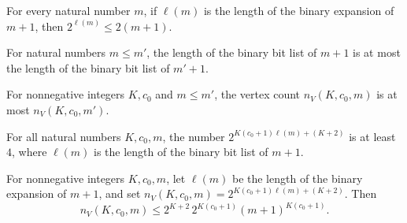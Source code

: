 \begin{lemma}
\label{Complexity.PathHard.two_pow_ell_le}
\leanok
{}
For every natural number $m$, if $\ell(m)$ is the length of the binary expansion of
$m+1$, then $2^{\ell(m)}\leq 2(m+1)$.
\end{lemma}

\begin{lemma}
\label{Complexity.PathHard.ell_mono}
\leanok
{}
For natural numbers $m\le m'$, the length of the binary bit list of $m+1$ is at most the
length of the binary bit list of $m'+1$.
\end{lemma}

\begin{lemma}
\label{Complexity.PathHard.nV_mono}
\leanok
{}
For nonnegative integers $K,c_0$ and $m\le m'$, the vertex count $n_V(K,c_0,m)$ is at
most $n_V(K,c_0,m')$.
\end{lemma}

\begin{lemma}
\label{Complexity.PathHard.four_le_nV}
\leanok
{}
For all natural numbers $K,c_0,m$, the number $2^{K(c_0+1)\ell(m)+(K+2)}$ is at least
$4$, where $\ell(m)$ is the length of the binary bit list of $m+1$.
\end{lemma}

\begin{lemma}
\label{Complexity.PathHard.nV_le}
\leanok
{}
For nonnegative integers $K,c_0,m$, let $\ell(m)$ be the length of the binary expansion
of $m+1$, and set $n_V(K,c_0,m)=2^{K(c_0+1)\ell(m)+(K+2)}$. Then \[n_V(K,c_0,m)\le
2^{K+2}\,2^{K(c_0+1)}(m+1)^{K(c_0+1)}.\]
\end{lemma}

